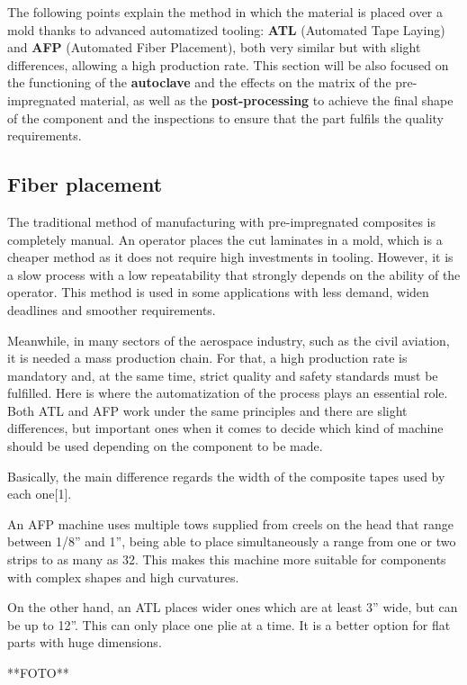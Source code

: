 The following points explain the method in which the material is placed over a mold thanks to advanced automatized tooling: \textbf{ATL} (Automated Tape Laying) and \textbf{AFP} (Automated Fiber Placement), both very similar but with slight differences, allowing a high production rate. This section will be also focused on the functioning of the \textbf{autoclave} and the effects on the matrix of the pre-impregnated material, as well as the \textbf{post-processing} to achieve the final shape of the component and the inspections to ensure that the part fulfils the quality requirements.

\subsection{Fiber placement}

The traditional method of manufacturing with pre-impregnated composites is completely manual. An operator places the cut laminates in a mold, which is a cheaper method as it does not require high investments in tooling. However, it is a slow process with a low repeatability that strongly depends on the ability of the operator. This method is used in some applications with less demand, widen deadlines and smoother requirements.

Meanwhile, in many sectors of the aerospace industry, such as the civil aviation, it is needed a mass production chain. For that, a high production rate is mandatory and, at the same time, strict quality and safety standards must be fulfilled. Here is where the automatization of the process plays an essential role. Both ATL and AFP work under the same principles and there are slight differences, but important ones when it comes to decide which kind of machine should be used depending on the component to be made.

Basically, the main difference regards the width of the composite tapes used by each one[1]. 

An AFP machine uses multiple tows supplied from creels on the head that range between 1/8” and 1”, being able to place simultaneously a range from one or two strips to as many as 32. This makes this machine more suitable for components with complex shapes and high curvatures.

On the other hand, an ATL places wider ones which are at least 3” wide, but can be up to 12”. This can only place one plie at a time. It is a better option for flat parts with huge dimensions.

**FOTO**

